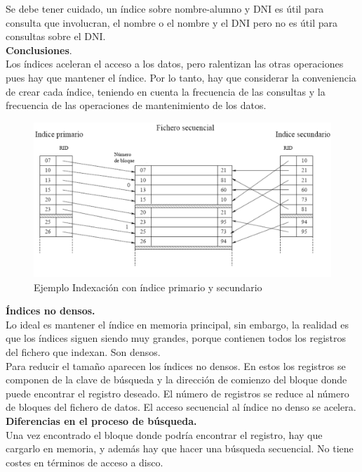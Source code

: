 \documentclass[a4paper,11pt]{article}
\begin{document}
Se debe tener cuidado, un índice sobre nombre-alumno y DNI es útil para consulta que involucran, el nombre o el nombre y el DNI pero no es útil para consultas sobre el DNI. \\

\textbf{Conclusiones}. \\
Los índices aceleran el acceso a los datos, pero ralentizan las otras operaciones pues hay que mantener el índice. Por lo tanto, hay que considerar la conveniencia de crear cada índice, teniendo en cuenta la frecuencia de las consultas y la frecuencia de las operaciones de mantenimiento de los datos.

\begin{figure}[h]
\centering
\caption{Ejemplo Indexación con índice primario y secundario}
\includegraphics[scale=1,width=1\textwidth]{ejemplo_secundario.png}
\end{figure}

\textbf{Índices no densos.} \\
Lo ideal es mantener el índice en memoria principal, sin embargo, la realidad es que los índices siguen siendo muy grandes, porque contienen todos los registros del fichero que indexan. Son densos. \\

Para reducir el tamaño aparecen los índices no densos. En estos los registros se componen de la clave de búsqueda y la dirección de comienzo del bloque donde puede encontrar el registro deseado. El número de registros se reduce al número de bloques del fichero de datos. El acceso secuencial al índice no denso se acelera. \\

\textbf{Diferencias en el proceso de búsqueda.} \\

Una vez encontrado el bloque donde podría encontrar el registro, hay que cargarlo en memoria, y además hay que hacer una búsqueda secuencial. No tiene costes en términos de acceso a disco. \\
\end{document}
